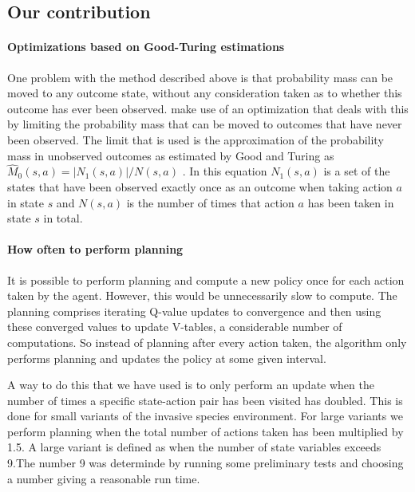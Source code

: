 \subsection{Our contribution}

\paragraph{Optimizations based on Good-Turing estimations}

\label{sec:mbie_gt}

One problem with the method described above is that probability mass can be
moved to any outcome state, without any consideration taken as to whether this
outcome has ever been observed. \textcite{dietterich2013pac} make
use of an optimization that deals with this by limiting the probability mass
that can be moved to outcomes that have never been observed. The limit that is used is the approximation
of the probability mass in unobserved outcomes as estimated by Good and Turing
as $\hat{M}_0(s,a) = |N_1(s,a)| / N(s,a)$ \parencite{gtpaper}. In this
equation $N_1(s,a)$ is a set of the states that have been observed exactly
once as an outcome when taking action $a$ in state $s$ and $N(s,a)$ is the
number of times that action $a$ has been taken in state $s$ in total. 

\paragraph{How often to perform planning}
\label{sec:mbie_perform_planning}

It is possible to perform planning and compute a new policy once for each
action taken by the agent. However, this would be unnecessarily slow to
compute. The planning comprises iterating Q-value updates to convergence and
then using these converged values to update V-tables, a considerable number of
computations. So instead of planning after every action taken, the algorithm
only performs planning and updates the policy at some given interval. 

A way to do this that we have used is to only perform an update when the
number of times a specific state-action pair has been visited has doubled. This is done for small variants of the invasive species environment. For
large variants we perform planning when
the total number of actions taken has been multiplied by 1.5. A large variant is defined as when the number of state variables exceeds 9.The number 9 was determinde by running some preliminary tests and choosing a number giving a reasonable run time.

